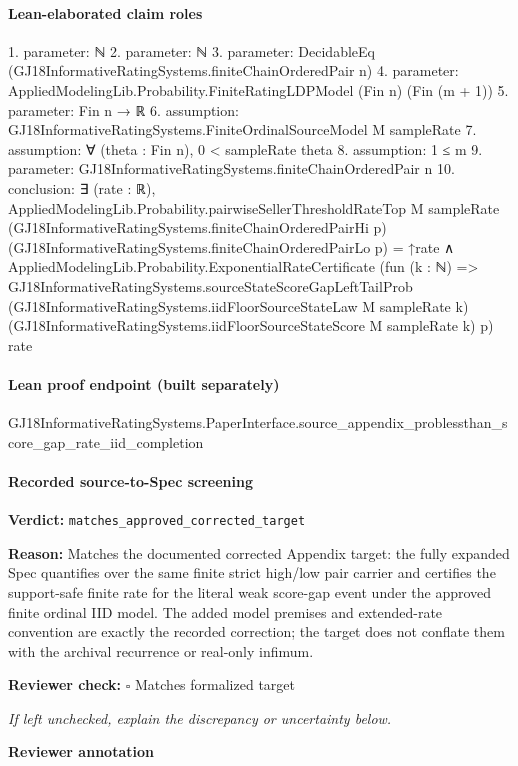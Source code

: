 \documentclass[10pt]{article}
\newcommand{\reviewerbox}{%
  \par\noindent\fbox{\parbox{0.96\linewidth}{\rule{0pt}{0.38in}}}\par
}
\newcommand{\reviewmatch}[1]{%
  \par\noindent\textbf{Reviewer check:} $\square$\; #1\par
  \noindent\emph{If left unchecked, explain the discrepancy or uncertainty below.}\par
}
\begin{document}
\paragraph{Lean-elaborated claim roles}\begin{ReviewVerbatim}
1. parameter: ℕ
2. parameter: ℕ
3. parameter: DecidableEq (GJ18InformativeRatingSystems.finiteChainOrderedPair n)
4. parameter: AppliedModelingLib.Probability.FiniteRatingLDPModel (Fin n) (Fin (m + 1))
5. parameter: Fin n → ℝ
6. assumption: GJ18InformativeRatingSystems.FiniteOrdinalSourceModel M sampleRate
7. assumption: ∀ (theta : Fin n), 0 < sampleRate theta
8. assumption: 1 ≤ m
9. parameter: GJ18InformativeRatingSystems.finiteChainOrderedPair n
10. conclusion: ∃ (rate : ℝ),
  AppliedModelingLib.Probability.pairwiseSellerThresholdRateTop M sampleRate
        (GJ18InformativeRatingSystems.finiteChainOrderedPairHi p)
        (GJ18InformativeRatingSystems.finiteChainOrderedPairLo p) =
      ↑rate ∧
    AppliedModelingLib.Probability.ExponentialRateCertificate
      (fun (k : ℕ) =>
        GJ18InformativeRatingSystems.sourceStateScoreGapLeftTailProb
          (GJ18InformativeRatingSystems.iidFloorSourceStateLaw M sampleRate k)
          (GJ18InformativeRatingSystems.iidFloorSourceStateScore M sampleRate k) p)
      rate
\end{ReviewVerbatim}

\paragraph{Lean proof endpoint (built separately)}\begin{ReviewVerbatim}
GJ18InformativeRatingSystems.PaperInterface.source_appendix_problessthan_score_gap_rate_iid_completion
\end{ReviewVerbatim}

\paragraph{Recorded source-to-Spec screening}
\textbf{Verdict:} \texttt{matches\_approved\_corrected\_target}
\\
{\raggedright
\textbf{Reason:} Matches the documented corrected Appendix target:\allowbreak{} the fully expanded Spec quantifies over the same finite strict high/\allowbreak{}low pair carrier and certifies the support-\allowbreak{}safe finite rate for the literal weak score-\allowbreak{}gap event under the approved finite ordinal IID model.\allowbreak{} The added model premises and extended-\allowbreak{}rate convention are exactly the recorded correction;\allowbreak{} the target does not conflate them with the archival recurrence or real-\allowbreak{}only infimum.\allowbreak{}
\par}
\reviewmatch{Matches formalized target}
\noindent\textbf{Reviewer annotation}\par
\reviewerbox
\clearpage
\hypertarget{source-claim-1d1f73c1a511cd77}{}
\end{document}
